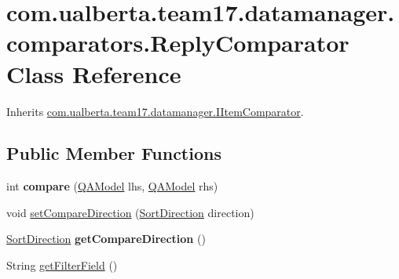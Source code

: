 \hypertarget{classcom_1_1ualberta_1_1team17_1_1datamanager_1_1comparators_1_1_reply_comparator}{\section{com.\+ualberta.\+team17.\+datamanager.\+comparators.\+Reply\+Comparator Class Reference}
\label{classcom_1_1ualberta_1_1team17_1_1datamanager_1_1comparators_1_1_reply_comparator}
}


Inherits \hyperlink{interfacecom_1_1ualberta_1_1team17_1_1datamanager_1_1_i_item_comparator}{com.\+ualberta.\+team17.\+datamanager.\+I\+Item\+Comparator}.

\subsection*{Public Member Functions}
\begin{DoxyCompactItemize}
\item 
\hypertarget{classcom_1_1ualberta_1_1team17_1_1datamanager_1_1comparators_1_1_reply_comparator_aaa487ac2414b44f169d392d7844263b5}{int {\bfseries compare} (\hyperlink{classcom_1_1ualberta_1_1team17_1_1_q_a_model}{Q\+A\+Model} lhs, \hyperlink{classcom_1_1ualberta_1_1team17_1_1_q_a_model}{Q\+A\+Model} rhs)}\label{classcom_1_1ualberta_1_1team17_1_1datamanager_1_1comparators_1_1_reply_comparator_aaa487ac2414b44f169d392d7844263b5}

\item 
void \hyperlink{classcom_1_1ualberta_1_1team17_1_1datamanager_1_1comparators_1_1_reply_comparator_ac307250b5edbcda0bceadcc6298c69ac}{set\+Compare\+Direction} (\hyperlink{enumcom_1_1ualberta_1_1team17_1_1datamanager_1_1_i_item_comparator_1_1_sort_direction}{Sort\+Direction} direction)
\item 
\hypertarget{classcom_1_1ualberta_1_1team17_1_1datamanager_1_1comparators_1_1_reply_comparator_a7c797abc07ce4c162f47b3eb96ce5b0b}{\hyperlink{enumcom_1_1ualberta_1_1team17_1_1datamanager_1_1_i_item_comparator_1_1_sort_direction}{Sort\+Direction} {\bfseries get\+Compare\+Direction} ()}\label{classcom_1_1ualberta_1_1team17_1_1datamanager_1_1comparators_1_1_reply_comparator_a7c797abc07ce4c162f47b3eb96ce5b0b}

\item 
String \hyperlink{classcom_1_1ualberta_1_1team17_1_1datamanager_1_1comparators_1_1_reply_comparator_a51895d0cb0cc64ad90082f71ac836aa9}{get\+Filter\+Field} ()
\end{DoxyCompactItemize}


